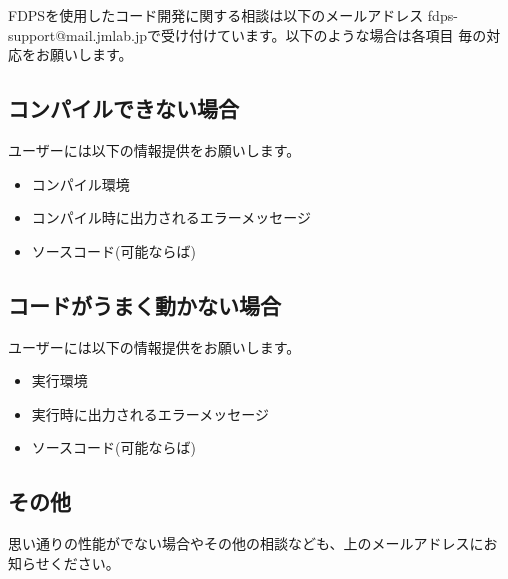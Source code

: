 FDPSを使用したコード開発に関する相談は以下のメールアドレス
fdps-support@mail.jmlab.jpで受け付けています。以下のような場合は各項目
毎の対応をお願いします。

\subsection{コンパイルできない場合}

ユーザーには以下の情報提供をお願いします。
\begin{itemize}
\item コンパイル環境
\item コンパイル時に出力されるエラーメッセージ
\item ソースコード(可能ならば)
\end{itemize}

\subsection{コードがうまく動かない場合}

ユーザーには以下の情報提供をお願いします。
\begin{itemize}
\item 実行環境
\item 実行時に出力されるエラーメッセージ
\item ソースコード(可能ならば)
\end{itemize}

\subsection{その他}

思い通りの性能がでない場合やその他の相談なども、上のメールアドレスにお
知らせください。
